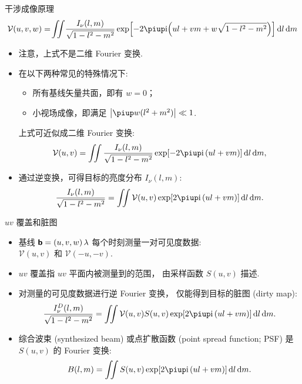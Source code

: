 \documentclass{beamer}
\begin{document}
\begin{frame}{干涉成像原理}
  \begin{equation}
    \mathcal{V}(u,v,w)
      = \!\iint \!\frac{I_{\nu}(l,m)}{\sqrt{1-l^2-m^2}}
      \exp \!\left[ -2\Cpi\Ci \!\left( ul+vm+w\sqrt{1-l^2-m^2} \right) \right]
      \D{l}\,\D{m}
  \end{equation}

  \begin{itemize}
    \item 注意，上式\alert{不是}二维 Fourier 变换.
    \item 在以下两种常见的特殊情况下:
      \begin{itemize}
        \item 所有基线矢量共面，即有 $w = 0$；
        \item 小视场成像，即满足 $\big| \Cpi w(l^2+m^2) \big| \ll 1$.
      \end{itemize}
      上式可近似成二维 Fourier 变换:
      \begin{equation}
        \mathcal{V}(u,v)
          = \iint \frac{I_{\nu}(l,m)}{\sqrt{1-l^2-m^2}}
            \exp [-2\Cpi\Ci\, (ul+vm)] \,\D{l}\,\D{m},
      \end{equation}
    \item 通过逆变换，可得目标的亮度分布 $I_{\nu}(l,m)$:
      \begin{equation}
        \frac{I_{\nu}(l,m)}{\sqrt{1-l^2-m^2}}
          = \iint \mathcal{V}(u,v)
            \exp [2\Cpi\Ci\, (ul+vm)] \,\D{l}\,\D{m}.
      \end{equation}
  \end{itemize}
\end{frame}

\begin{frame}{$uv$ 覆盖和脏图}
  \begin{itemize}
    \item 基线 $\bm{\mathsf{b}} = (u,v,w) \,\lambda$ 每个时刻测量一对可见度数据: \\
      $\mathcal{V}(u,v)$ 和 $\mathcal{V}(-u,-v)$.
    \item \alert{$uv$ 覆盖}指 $uv$ 平面内被测量到的范围，
      由\alert{采样函数} $S(u,v)$ 描述.
    \item 对测量的可见度数据进行逆 Fourier 变换，
      仅能得到目标的\alert{脏图 (dirty map)}:
      \begin{equation}
        \frac{I_{\nu}^D(l,m)}{\sqrt{1-l^2-m^2}}
          = \iint \mathcal{V}(u,v) S(u,v)
            \exp [2\Cpi\Ci\, (ul+vm)] \,\D{l}\,\D{m}.
      \end{equation}
    \item \alert{综合波束 (synthesized beam)}
      或\alert{点扩散函数 (point spread function; PSF)}
      是 $S(u,v)$ 的 Fourier 变换:
      \begin{equation}
        B(l,m) = \iint S(u,v) \exp [2\Cpi\Ci\, (ul+vm)] \,\D{l}\,\D{m}.
      \end{equation}
  \end{itemize}
\end{frame}
\end{document}
